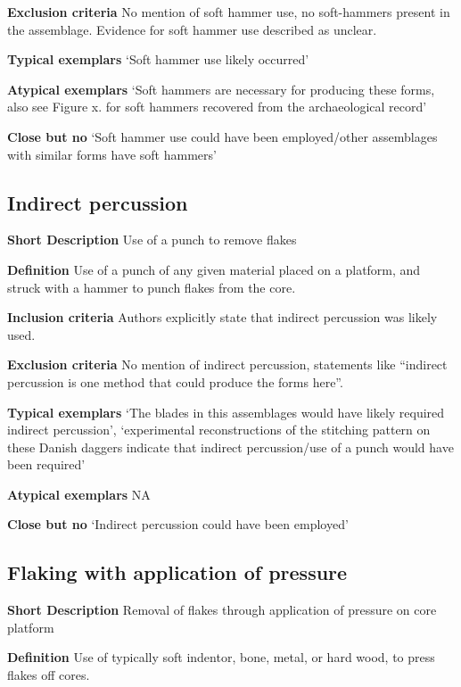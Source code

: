\documentclass[
]{article}
\begin{document}
\textbf{Exclusion criteria} No mention of soft hammer use, no
soft-hammers present in the assemblage. Evidence for soft hammer use
described as unclear.

\textbf{Typical exemplars} `Soft hammer use likely occurred'

\textbf{Atypical exemplars} `Soft hammers are necessary for producing
these forms, also see Figure x. for soft hammers recovered from the
archaeological record'

\textbf{Close but no} `Soft hammer use could have been employed/other
assemblages with similar forms have soft hammers'

\hypertarget{indirect-percussion}{%
\subsection{Indirect percussion}\label{indirect-percussion}}

\textbf{Short Description} Use of a punch to remove flakes

\textbf{Definition} Use of a punch of any given material placed on a
platform, and struck with a hammer to punch flakes from the core.

\textbf{Inclusion criteria} Authors explicitly state that indirect
percussion was likely used.

\textbf{Exclusion criteria} No mention of indirect percussion,
statements like ``indirect percussion is one method that could produce
the forms here''.

\textbf{Typical exemplars} `The blades in this assemblages would have
likely required indirect percussion', `experimental reconstructions of
the stitching pattern on these Danish daggers indicate that indirect
percussion/use of a punch would have been required'

\textbf{Atypical exemplars} NA

\textbf{Close but no} `Indirect percussion could have been employed'

\hypertarget{flaking-with-application-of-pressure}{%
\subsection{Flaking with application of
pressure}\label{flaking-with-application-of-pressure}}

\textbf{Short Description} Removal of flakes through application of
pressure on core platform

\textbf{Definition} Use of typically soft indentor, bone, metal, or hard
wood, to press flakes off cores.
\end{document}
